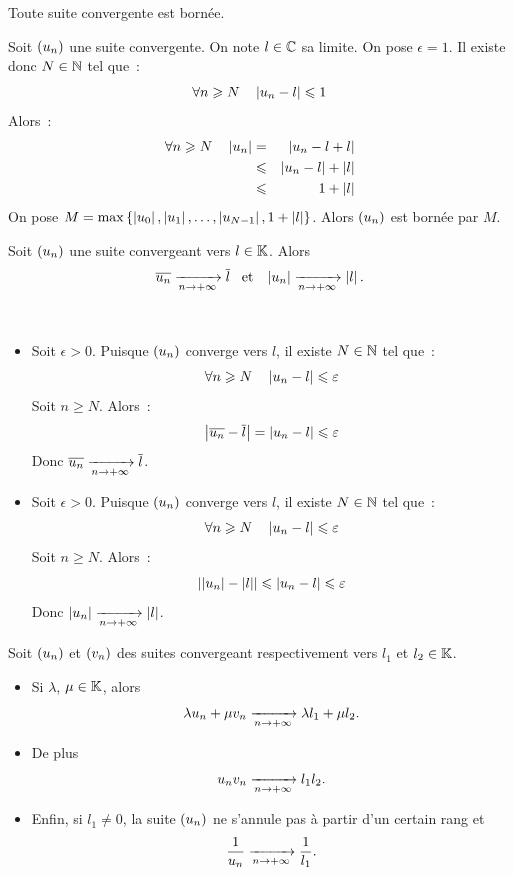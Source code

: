 \documentclass{magnoliaold}
\begin{document}

\begin{proposition}[utile=-3]
Toute suite convergente est bornée.  
\end{proposition}

\begin{preuve}
Soit $\left(u_n\right)$ une suite convergente. On note $l\in\mathbb{C}$ sa limite. On pose
$\epsilon=1$. Il existe donc $N\in\mathbb{N}$ tel que~:
\[\forall n\geqslant N \quad \left|u_n-l\right|\leqslant 1\]
Alors~:
\begin{eqnarray*}
\forall n\geqslant N \quad \left|u_n\right|  
&=& \left|u_n-l+l\right|\\
&\leqslant& \left|u_n-l\right|+\left|l\right|\\
&\leqslant& 1+\left|l\right|
\end{eqnarray*}
On pose $M=\max\left\{\left|u_0\right|,\left|u_1\right|,\ldots,\left|u_{N-1}\right|,1+\left|l\right|\right\}$. Alors
$\left(u_n\right)$ est bornée par $M$.
\end{preuve}

\begin{proposition}[utile=-3]
Soit $\left(u_n\right)$ une suite convergeant vers $l\in\mathbb{K}$. Alors
\[\overline{u_n}\xrightarrow[n\rightarrow +\infty]{}\overline{l} \quad\!\text{et}\quad\!
  \left|u_n\right|\xrightarrow[n\rightarrow +\infty]{} \left|l\right|.\]
\end{proposition}

\begin{preuve}
$\quad$
\begin{itemize}
\item Soit $\epsilon>0$. Puisque $\left(u_n\right)$ converge vers $l$, il existe
  $N\in\mathbb{N}$ tel que~:
  \[\forall n\geqslant N \quad \left|u_n-l\right|\leqslant\varepsilon\]
  Soit $n\geq N$. Alors~:
  \[\left|\overline{u_n}-\overline{l}\right|=\left|u_n-l\right|\leqslant\varepsilon\]
  Donc $\overline{u_n}\xrightarrow[n\rightarrow +\infty]{}\overline{l}$.
\item Soit $\epsilon>0$. Puisque $\left(u_n\right)$ converge vers $l$, il existe
  $N\in\mathbb{N}$ tel que~:
  \[\forall n\geqslant N \quad \left|u_n-l\right|\leqslant\varepsilon\]
  Soit $n\geq N$. Alors~:
  \[\left|\left|u_n\right|-\left|l\right|\right|\leqslant\left|u_n-l\right|\leqslant\varepsilon\]
  Donc $\left|u_n\right|\xrightarrow[n\rightarrow +\infty]{}\left|l\right|$.
\end{itemize}
\end{preuve}


\begin{proposition}[utile=-3]
Soit $\left(u_n\right)$ et $\left(v_n\right)$ des suites convergeant respectivement
vers $l_1$ et $l_2\in\mathbb{K}$.
\begin{itemize}
\item Si $\lambda$, $\mu\in\mathbb{K}$, alors
  \[\lambda u_n+\mu v_n \xrightarrow[n\rightarrow +\infty]{} \lambda l_1+\mu l_2.\]
\item De plus
  \[u_n v_n \xrightarrow[n\rightarrow +\infty]{} l_1 l_2.\]
\item Enfin, si $l_1\neq 0$, la suite $\left(u_n\right)$ ne s'annule pas à partir d'un
  certain rang et
  \[\frac{1}{u_n}\xrightarrow[n\rightarrow +\infty]{}\frac{1}{l_1}.\]
\end{itemize}
\end{proposition}
\end{document}
